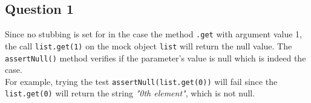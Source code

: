 \subsection*{Question 1}

\noindent Since no stubbing is set for in the case the method \verb|.get| with argument value 1, the call \verb|list.get(1)| on the mock object \verb|list| will return the null value. The \verb|assertNull()| method verifies if the parameter's value is null which is indeed the case.\\ For example, trying the test \verb|assertNull(list.get(0))| will fail since the \verb|list.get(0)| will return the string \textit{"0th element"}, which is not null. 